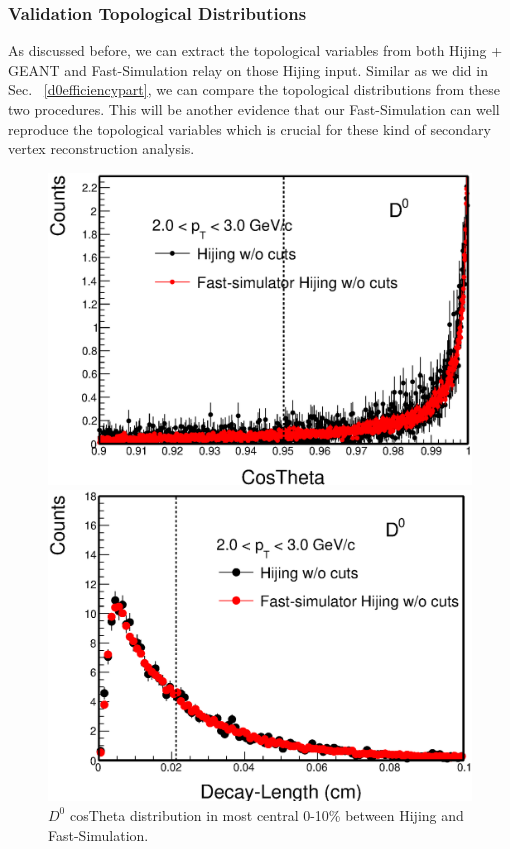 \subsubsection{Validation Topological Distributions}
\label{validationTopo}

As discussed before, we can extract the topological variables from both Hijing + GEANT and Fast-Simulation relay on those Hijing input. Similar as we did in Sec. ~\ref{d0efficiencypart}, we can compare the topological distributions from these two procedures. This will be another evidence that our Fast-Simulation can well reproduce the topological variables which is crucial for these kind of secondary vertex reconstruction analysis.

\begin{figure}[htbp]
\begin{minipage}[htbp]{0.52\linewidth}
\centering
\includegraphics[width=1.0\textwidth,angle=0]{figure/Run14_D0HFT/HijingcosTheta.eps}
\caption{ $D^0$ cosTheta distribution in most central 0-10\% between Hijing and Fast-Simulation.\label{Hijingpointingangle}}
\end{minipage}
\hfill
\begin{minipage}[htbp]{0.52\linewidth}
\centering
\includegraphics[width=1.0\textwidth,angle=0]{figure/Run14_D0HFT/HijingDecayL.eps} 

\end{minipage}
\end{figure}

